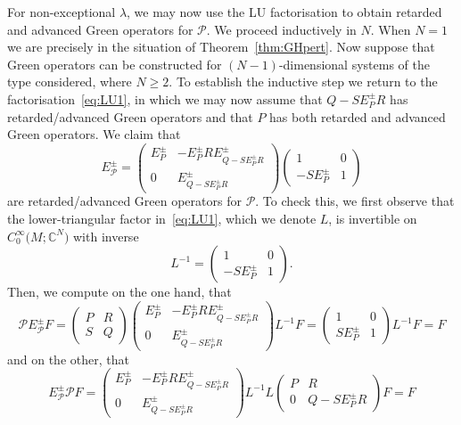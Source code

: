\documentclass[pdftex]{sigma}
\numberwithin{equation}{section}
\newcommand{\CC}{{\mathbb C}}
\newcommand{\CoinX}[1]{C_0^\infty\big({#1}\big)}
\newcommand{\Ps}{\mathcal{P}}
\begin{document}
 For non-exceptional $\lambda$, we may now use the LU factorisation to obtain
 retarded and advanced Green operators for $\Ps$. We proceed inductively in $N$.
 When $N=1$ we are precisely in the situation of Theorem~\ref{thm:GHpert}.
 Now suppose that Green operators can be constructed for $(N-1)$-dimensional systems of the type considered, where $N\ge 2$. To establish the inductive
 step we return to the factorisation~\eqref{eq:LU1}, in which we may now
 assume that $Q-SE_P^\pm R$ has retarded/advanced Green operators and that $P$ has both retarded and advanced Green operators. We claim that
 \begin{equation}\label{eq:candidates}
 	E^\pm_{\Ps} = \begin{pmatrix}
 		E_P^\pm & -E_P^\pm RE_{Q-SE_P^\pm R}^\pm \\
 		0 & E_{Q-SE_P^\pm R}^\pm
 	\end{pmatrix}
 	\begin{pmatrix} 1 & 0 \\ -SE_P^\pm & 1\end{pmatrix}
 \end{equation}
 are retarded/advanced Green operators for $\Ps$. To check this, we first observe that the lower-triangular factor in~\eqref{eq:LU1}, which we denote $L$, is invertible on $\CoinX{M;\CC^N}$ with inverse
 \begin{equation*}
 	L^{-1} = \begin{pmatrix} 1 & 0 \\ -SE_P^\pm & 1\end{pmatrix}.
 \end{equation*}
 Then, we compute on the one hand, that
 \begin{equation*}
 	\Ps 	E^\pm_{\Ps} F = \begin{pmatrix} P & R \\ S & Q\end{pmatrix}
 	\begin{pmatrix}
 		E_P^\pm & -E_P^\pm RE_{Q-SE_P^\pm R}^\pm \\
 		0 & E_{Q-SE_P^\pm R}^\pm
 	\end{pmatrix}
 	L^{-1} F=
 	\begin{pmatrix} 1 & 0 \\ SE_P^\pm & 1\end{pmatrix}
 	L^{-1} F = F
 \end{equation*}
 and on the other, that
 \begin{equation*}
 	E^\pm_{\Ps}	\Ps F = \begin{pmatrix}
 		E_P^\pm & -E_P^\pm RE_{Q-SE_P^\pm R}^\pm \\
 		0 & E_{Q-SE_P^\pm R}^\pm
 	\end{pmatrix}
 	L^{-1}L \begin{pmatrix} P & R \\ 0 & Q - SE_P^\pm R \end{pmatrix} F=
 	F
 \end{equation*}
\end{document}
